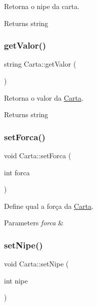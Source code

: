 Retorna o nipe da carta. 

\begin{DoxyReturn}{Returns}
string 
\end{DoxyReturn}
\mbox{\label{class_carta_a6d152881485bd02097ea3e18f63497ed}} 
\subsubsection{\texorpdfstring{getValor()}{getValor()}}
{\footnotesize\ttfamily string Carta\+::get\+Valor (\begin{DoxyParamCaption}{ }\end{DoxyParamCaption})}



Retorna o valor da \mbox{\hyperlink{class_carta}{Carta}}. 

\begin{DoxyReturn}{Returns}
string 
\end{DoxyReturn}
\mbox{\label{class_carta_a3702c22fee4f1b046eced67efb2ecb80}} 
\subsubsection{\texorpdfstring{setForca()}{setForca()}}
{\footnotesize\ttfamily void Carta\+::set\+Forca (\begin{DoxyParamCaption}\item[{int}]{forca }\end{DoxyParamCaption})}



Define qual a força da \mbox{\hyperlink{class_carta}{Carta}}. 


\begin{DoxyParams}{Parameters}
{\em forca} & \\
\hline
\end{DoxyParams}
\mbox{\label{class_carta_af3e357fb2a7b18ab435239a45e404ccd}} 
\subsubsection{\texorpdfstring{setNipe()}{setNipe()}\hspace{0.1cm}{\footnotesize\ttfamily [1/2]}}
{\footnotesize\ttfamily void Carta\+::set\+Nipe (\begin{DoxyParamCaption}\item[{int}]{nipe }\end{DoxyParamCaption})}



